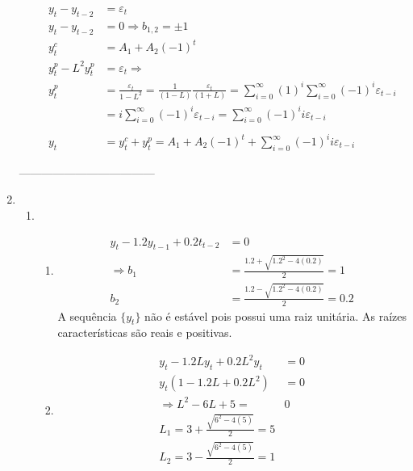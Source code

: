 \begin{enumerate}
\begin{enumerate}
		\begin{align*}
			y_t-y_{t-2}&=\varepsilon_t\\
			y_t-y_{t-2}&=0 \Rightarrow b_{1,2}=\pm1\\
			y_t^c&=A_1+A_2(-1)^t\\
			y_t^p-L^2y_t^p&=\varepsilon_t\Rightarrow\\ y_t^p&=\frac{\varepsilon_t}{1-L^2}=\frac{1}{(1-L)}\frac{\varepsilon_t}{(1+L)}=\sum \limits_{i=0}^{\infty}(1)^i\sum \limits_{i=0}^{\infty}(-1)^i\varepsilon_{t-i}\\
			&=i\sum \limits_{i=0}^{\infty}(-1)^i\varepsilon_{t-i}=\sum \limits_{i=0}^{\infty}(-1)^ii\varepsilon_{t-i}\\
			\\
			y_t&=y_t^c+y_t^p=A_1+A_2(-1)^t+\sum \limits_{i=0}^{\infty}(-1)^ii\varepsilon_{t-i}
		\end{align*}
	
	\end{enumerate}
	
	------------------------------------
	
	\item %
	
	\begin{enumerate}
		
		\item %
		\begin{enumerate}
			\item %
		
		\begin{align*}
			y_t-1.2y_{t-1}+0.2t_{t-2}&=0\\
			\Rightarrow b_1&=\frac{1.2+\sqrt{1.2^2-4(0.2)}}{2}=1\\
			b_2&=\frac{1.2-\sqrt{1.2^2-4(0.2)}}{2}=0.2
		\end{align*}		
		A sequência $\{y_t\}$ não é estável pois possui uma raiz unitária. As raízes características são reais e positivas.
		
		\item %
		
		\begin{align*}
			y_t-1.2Ly_t+0.2L^2y_t&=0\\
			y_t(1-1.2L+0.2L^2)&=0\\
			\Rightarrow L^2-6L+5=&0\\
			L_1=3+\frac{\sqrt{6^2-4(5)}}{2}=5\\
			L_2=3-\frac{\sqrt{6^2-4(5)}}{2}=1\\
			\end{align*}
			

\end{enumerate}
\end{enumerate}
\end{enumerate}
